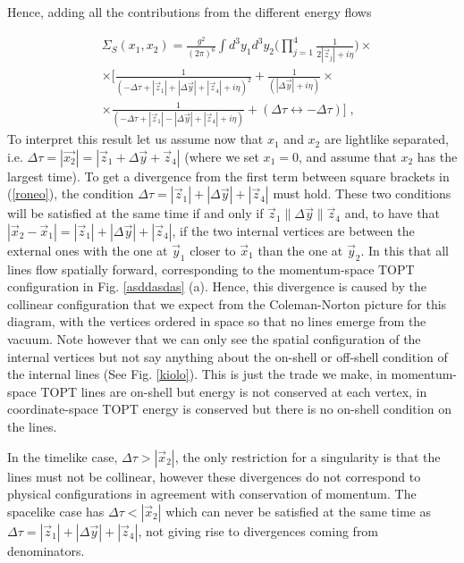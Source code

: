 \documentclass[%
 reprint,
 amsmath,amssymb,
 aps,
]{revtex4-1}
\begin{document}
 Hence, adding all the contributions from the different energy flows
 

 
 
 
\begin{align}
&\Sigma_S(x_1,x_2)=\frac{g^2}{(2\pi)^6}\int d^3y_1d^3y_2\Big(\prod_{j=1}^4\frac{1}{2|\vec{z}_j|+i\eta}\Big)\times\nonumber\\
&\times\Big[\frac{1}{(-\Delta\tau+|\vec{z}_1|+|\Delta\vec{y}|+|\vec{z}_4|+i\eta)^2}+\frac{1}{(|\Delta\vec{y}|+i\eta)}\times\nonumber\\
 &\times\frac{1}{(-\Delta\tau+|\vec{z}_1|-|\Delta \vec{y}|+|\vec{z}_4|+i\eta)}+(\Delta\tau\leftrightarrow-\Delta\tau)\Big]\;,\label{roneo}
 \end{align}
 To interpret this result let us assume now that $x_1$ and $x_2$ are lightlike separated, i.e. $\Delta\tau=|\vec{x_2}|=|\vec{z}_1+\Delta \vec{y}+\vec{z}_4|$ (where we set $x_1=0$, and assume that $x_2$ has the largest time). To get a divergence from the first term between square brackets in (\ref{roneo}), the condition $\Delta\tau=|\vec{z}_1|+|\Delta \vec{y}|+|\vec{z}_4|$ must hold. These two conditions will be satisfied at the same time if and only if $\vec{z}_1\parallel\Delta \vec{y}\parallel \vec{z}_4$ and, to have that $|\vec{x}_2-\vec{x}_1|=|\vec{z}_1|+|\Delta \vec{y}|+|\vec{z}_4|$, if the two internal vertices are between the external ones with the one at $\vec{y}_1$ closer to $\vec{x}_1$ than the one at $\vec{y}_2$. In this that all lines flow spatially forward, corresponding to the momentum-space TOPT configuration in Fig. \ref{asddasdas} (a). Hence, this divergence is caused by the collinear configuration that we expect from the Coleman-Norton picture for this diagram, with the vertices ordered in space so that no lines emerge from the vacuum. Note however that we can only see the spatial configuration of the internal vertices but not say anything about the on-shell or off-shell condition of the internal lines (See Fig. \ref{kiolo}). This is just the trade we make, in momentum-space 
TOPT lines are on-shell but energy is not conserved at each vertex, in coordinate-space TOPT energy is conserved but there is no on-shell condition on the lines.\par
 In the timelike case, $\Delta\tau>|\vec{x}_2|$, the only restriction for a singularity is that the lines must not be collinear, however these divergences do not correspond to physical configurations in agreement with conservation of momentum. The spacelike case has $\Delta\tau<|\vec{x}_2|$ which can never be satisfied at the same time as $\Delta\tau=|\vec{z}_1|+|\Delta \vec{y}|+|\vec{z}_4|$, not giving rise to divergences coming from denominators.
 
\end{document}
